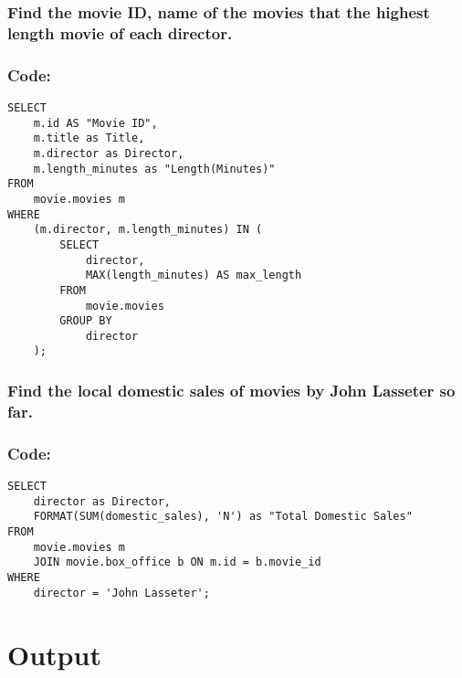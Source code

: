 \documentclass[12pt]{article}
\begin{document}
\vspace{5mm}
\subsubsection{Find the movie ID, name of the movies that the highest length movie of each director.}
\subsubsection*{Code:}

\begin{verbatim}
SELECT
    m.id AS "Movie ID",
    m.title as Title,
    m.director as Director,
    m.length_minutes as "Length(Minutes)"
FROM
    movie.movies m
WHERE
    (m.director, m.length_minutes) IN (
        SELECT
            director,
            MAX(length_minutes) AS max_length
        FROM
            movie.movies
        GROUP BY
            director
    );
\end{verbatim}
\vspace{5mm}
\subsubsection{Find the local domestic sales of movies by John Lasseter so far.}
\subsubsection*{Code:}

\begin{verbatim}
SELECT
    director as Director,
    FORMAT(SUM(domestic_sales), 'N') as "Total Domestic Sales"
FROM
    movie.movies m
    JOIN movie.box_office b ON m.id = b.movie_id
WHERE
    director = 'John Lasseter';
\end{verbatim}

\section{Output}

\pagebreak

\end{document}
